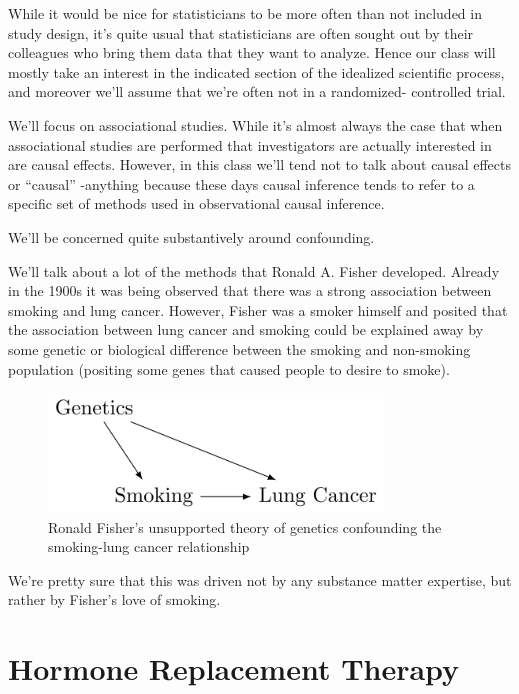 \documentclass[
  letterpaper,
  DIV=11,
  numbers=noendperiod]{scrreport}
\begin{document}
While it would be nice for statisticians to be more often than not
included in study design, it's quite usual that statisticians are often
sought out by their colleagues who bring them data that they want to
analyze. Hence our class will mostly take an interest in the indicated
section of the idealized scientific process, and moreover we'll assume
that we're often not in a randomized- controlled trial.

We'll focus on {associational studies}. While it's almost always the
case that when associational studies are performed that investigators
are actually interested in are {causal effects}. However, in this class
we'll tend not to talk about causal effects or ``causal'' -anything
because these days causal inference tends to refer to a specific set of
methods used in observational causal inference.

We'll be concerned quite substantively around confounding.

We'll talk about a lot of the methods that Ronald A. Fisher developed.
Already in the 1900s it was being observed that there was a strong
association between smoking and lung cancer. However, Fisher was a
smoker himself and posited that the association between lung cancer and
smoking could be explained away by some genetic or biological difference
between the smoking and non-smoking population (positing some genes that
caused people to desire to smoke).

\begin{figure}

{\centering \includegraphics[width=3.5in,height=\textheight]{week1/standalone_figures/confounding/smoking_confounding.svg}

}

\caption{Ronald Fisher's unsupported theory of genetics confounding the
smoking-lung cancer relationship}

\end{figure}

We're pretty sure that this was driven not by any substance matter
expertise, but rather by Fisher's love of smoking.

\hypertarget{hormone-replacement-therapy}{%
\section{Hormone Replacement
Therapy}\label{hormone-replacement-therapy}}
\end{document}
